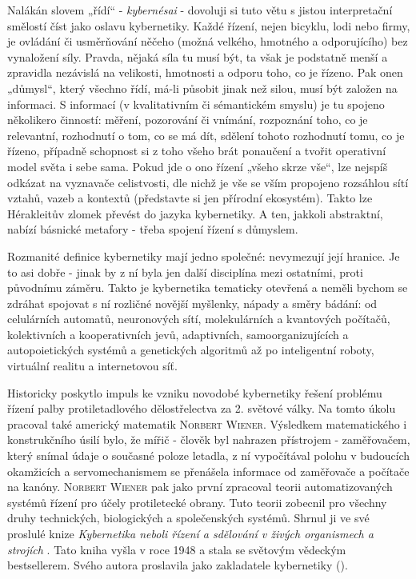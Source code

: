     Nalákán slovem „řídí“ - \emph{kybernésai} - dovoluji si tuto větu s jistou interpretační
    smělostí číst jako oslavu kybernetiky. Každé řízení, nejen bicyklu, lodi nebo firmy, je ovládání
    či usměrňování něčeho (možná velkého, hmotného a odporujícího) bez vynaložení síly. Pravda,
    nějaká síla tu musí být, ta však je podstatně menší a zpravidla nezávislá na velikosti,
    hmotnosti a odporu toho, co je řízeno. Pak onen „důmysl“, který všechno řídí, má-li působit
    jinak než silou, musí být založen na informaci. S informací (v kvalitativním či sémantickém
    smyslu) je tu spojeno několikero činností: měření, pozorování či vnímání, rozpoznání toho, co je
    relevantní, rozhodnutí o tom, co se má dít, sdělení tohoto rozhodnutí tomu, co je řízeno,
    případně schopnost si z toho všeho brát ponaučení a tvořit operativní model světa i sebe sama.
    Pokud jde o ono řízení „všeho skrze vše“, lze nejspíš odkázat na vyznavače celistvosti, dle
    nichž je vše se vším propojeno rozsáhlou sítí vztahů, vazeb a kontextů (představte si jen
    přírodní ekosystém). Takto lze Hérakleitův zlomek převést do jazyka kybernetiky. A ten, jakkoli
    abstraktní, nabízí básnické metafory - třeba spojení řízení s důmyslem.


    Rozmanité definice kybernetiky mají jedno společné: nevymezují její hranice. Je to asi dobře -
    jinak by z ní byla jen další disciplína mezi ostatními, proti původnímu záměru. Takto je
    kybernetika tematicky otevřená a neměli bychom se zdráhat spojovat s ní rozličné novější
    myšlenky, nápady a směry bádání: od celulárních automatů, neuronových sítí, molekulárních a
    kvantových počítačů, kolektivních a kooperativních jevů, adaptivních, samoorganizujících a
    autopoietických systémů a genetických algoritmů až po inteligentní roboty, virtuální realitu a
    internetovou síť.
 
    Historicky poskytlo impuls ke vzniku novodobé kybernetiky řešení problému řízení palby
    protiletadlového dělostřelectva za 2. světové války. Na tomto úkolu pracoval také americký
    matematik \textsc{Norbert Wiener}. Výsledkem matematického i konstrukčního úsilí bylo, že mířič
    - člověk byl nahrazen přístrojem - zaměřovačem, který snímal údaje o současné poloze letadla, z
    ní vypočítával polohu v budoucích okamžicích a servomechanismem se přenášela informace od
    zaměřovače a počítače na kanóny. \textsc{Norbert Wiener} pak jako první zpracoval teorii
    automatizovaných systémů řízení pro účely protiletecké obrany. Tuto teorii zobecnil pro všechny
    druhy technických, biologických a společenských systémů. Shrnul ji ve své proslulé knize
    \emph{Kybernetika neboli řízení a sdělování v živých organismech a strojích} \cite{Wiener1961}.
    Tato kniha vyšla v roce \num{1948} a stala se světovým vědeckým bestsellerem. Svého autora
    proslavila jako zakladatele kybernetiky (\cite[s.~6]{Svarc1986}).

